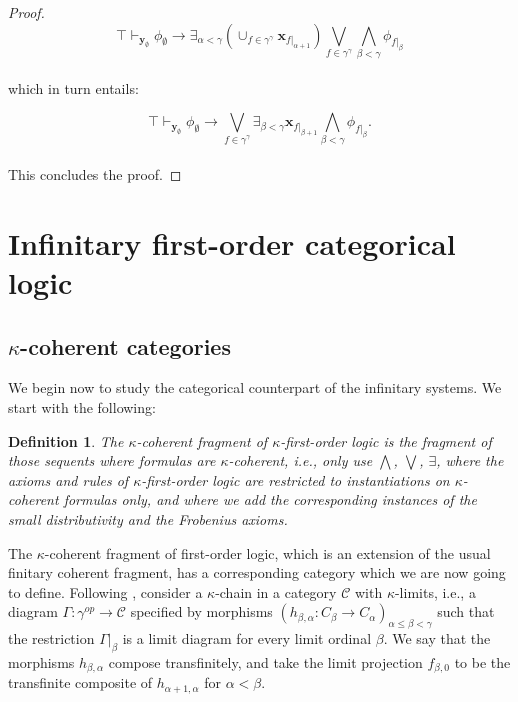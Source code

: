 \documentclass[a4paper,11pt]{article}
\theoremstyle{plain}
\theoremstyle{plain}
\newtheorem{defs}[thm]{Definition}
\theoremstyle{remark}
\begin{document}
\begin{proof}
$$\top \vdash_{\mathbf{y}_{\emptyset}} \phi_{\emptyset} \to \exists_{\alpha < \gamma} (\cup_{f \in \gamma^{\gamma}}\mathbf{x}_{f|_{\alpha+1}}) \bigvee_{f \in \gamma^{\gamma}} \bigwedge_{\beta<\gamma}\phi_{f|_\beta}$$
\\
which in turn entails:

$$\top \vdash_{\mathbf{y}_{\emptyset}} \phi_{\emptyset} \to \bigvee_{f \in \gamma^{\gamma}} \exists_{\beta<\gamma}\mathbf{x}_{f|_{\beta +1}} \bigwedge_{\beta<\gamma}\phi_{f|_\beta}.$$
\\
This concludes the proof.
\end{proof}


\section{Infinitary first-order categorical logic}

\subsection{$\kappa$-coherent categories}

We begin now to study the categorical counterpart of the infinitary systems. We start with the following:

\begin{defs}
The $\kappa$-coherent fragment of $\kappa$-first-order logic is the fragment of those sequents where formulas are $\kappa$-coherent, i.e., only use $\bigwedge$, $\bigvee$, $\exists$, where the axioms and rules of $\kappa$-first-order logic are restricted to instantiations on $\kappa$-coherent formulas only, and where we add the corresponding instances of the small distributivity and the Frobenius axioms. 
\end{defs}

The $\kappa$-coherent fragment of first-order logic, which is an extension of the usual finitary coherent fragment, has a corresponding category which we are now going to define. Following \cite{makkai}, consider a $\kappa$-chain in a category $\mathcal{C}$ with $\kappa$-limits, i.e., a diagram $\Gamma: \gamma^{op} \to \mathcal{C}$ specified by morphisms $(h_{\beta, \alpha}: C_{\beta} \to C_{\alpha})_{\alpha \leq \beta<\gamma}$ such that the restriction $\Gamma|_{\beta}$ is a limit diagram for every limit ordinal $\beta$. We say that the morphisms $h_{\beta, \alpha}$ compose transfinitely, and take the limit projection $f_{\beta, 0}$ to be the transfinite composite of $h_{\alpha+1, \alpha}$ for $\alpha<\beta$.
\end{document}

